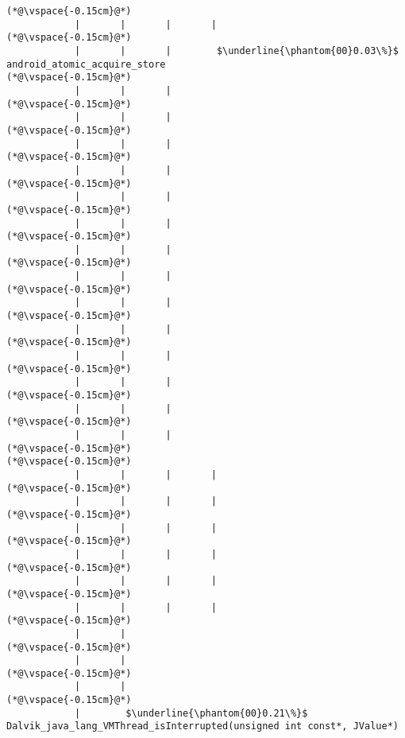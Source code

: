 \begin{lstlisting}[caption=20 viiteparametria Java$\to$C , label=profile:J2CBenchmark00206, numberbychapter=true, frame=lines, float, floatplacement=t]
(*@\vspace{-0.15cm}@*)
            |       |       |       |
(*@\vspace{-0.15cm}@*)
            |       |       |        $\underline{\phantom{00}0.03\%}$ android_atomic_acquire_store
(*@\vspace{-0.15cm}@*)
            |       |       |
(*@\vspace{-0.15cm}@*)
            |       |       |
(*@\vspace{-0.15cm}@*)
            |       |       |
(*@\vspace{-0.15cm}@*)
            |       |       |
(*@\vspace{-0.15cm}@*)
            |       |       |
(*@\vspace{-0.15cm}@*)
            |       |       |
(*@\vspace{-0.15cm}@*)
            |       |       |
(*@\vspace{-0.15cm}@*)
            |       |       |
(*@\vspace{-0.15cm}@*)
            |       |       |
(*@\vspace{-0.15cm}@*)
            |       |       |
(*@\vspace{-0.15cm}@*)
            |       |       |
(*@\vspace{-0.15cm}@*)
            |       |       |
(*@\vspace{-0.15cm}@*)
            |       |       |
(*@\vspace{-0.15cm}@*)
            |       |       |
(*@\vspace{-0.15cm}@*)
(*@\vspace{-0.15cm}@*)
            |       |       |       |
(*@\vspace{-0.15cm}@*)
            |       |       |       |
(*@\vspace{-0.15cm}@*)
            |       |       |       |
(*@\vspace{-0.15cm}@*)
            |       |       |       |
(*@\vspace{-0.15cm}@*)
            |       |       |       |
(*@\vspace{-0.15cm}@*)
            |       |       |       |
(*@\vspace{-0.15cm}@*)
            |       |
(*@\vspace{-0.15cm}@*)
            |       |
(*@\vspace{-0.15cm}@*)
            |       |
(*@\vspace{-0.15cm}@*)
            |        $\underline{\phantom{00}0.21\%}$ Dalvik_java_lang_VMThread_isInterrupted(unsigned int const*, JValue*)

\end{lstlisting}
